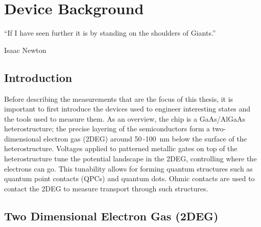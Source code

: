 \chapter{Device Background}\label{cha:device_background}


\epigraph{``If I have seen further it is by standing on the shoulders of Giants.''}{Isaac Newton~\cite{newton1959correspondence}}

\section{Introduction}

\noindent Before describing the measurements that are the focus of this thesis, it is important to first introduce the devices used to engineer interesting states and the tools used to measure them. As an overview, the chip is a GaAs/AlGaAs heterostructure; the precise layering of the semiconductors form a two-dimensional electron gas (2DEG) around 50\,-\qty{100}{nm} below the surface of the heterostructure. Voltages applied to patterned metallic gates on top of the heterostructure tune the potential landscape in the 2DEG, controlling where the electrons can go. This tunability allows for forming quantum structures such as quantum point contacts (QPCs) and quantum dots. Ohmic contacts are used to contact the 2DEG to measure transport through such structures. 



\section{Two Dimensional Electron Gas (2DEG)}



